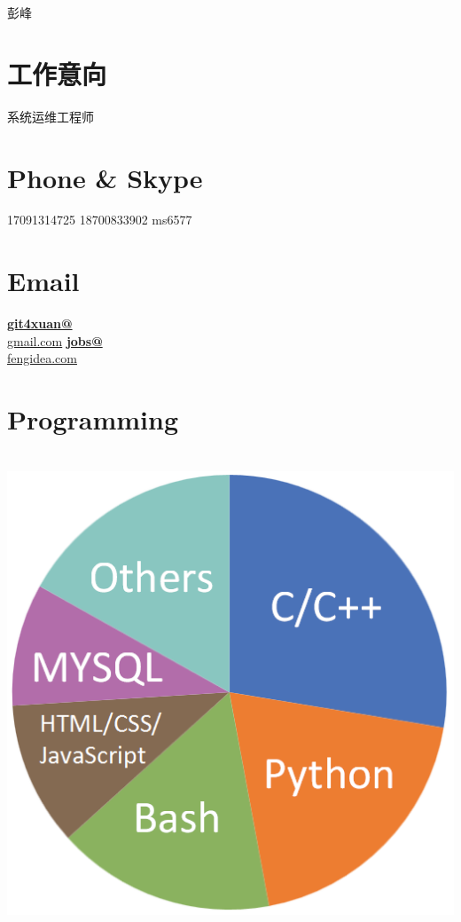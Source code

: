 \documentclass[]{friggeri-cv}
\begin{document}
      { 彭峰 } 
      



\begin{aside}
  \section{工作意向}
    系统运维工程师
    ~
  \section{Phone \& Skype}
    17091314725
    18700833902
    ms6577
    ~
  \section{Email}
    \href{mailto:git4xuan@gmail.com}{\textbf{git4xuan@}\\gmail.com}
    \href{mailto:jobs@fengidea.com}{\textbf{jobs@}\\fengidea.com}
    ~
    ~
  \section{Programming}
  ~
    \includegraphics[scale=0.25]{img/programming3.png}
    ~

\end{aside}
\end{document}
